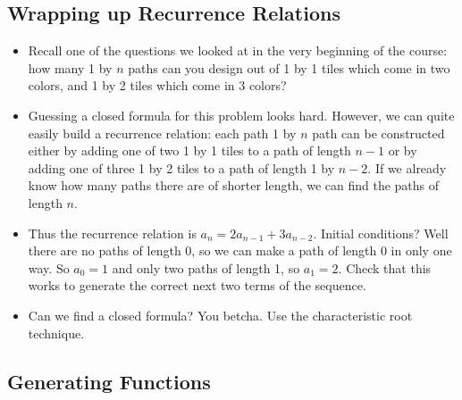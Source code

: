 \subsection*{Wrapping up Recurrence Relations}
\begin{itemize}
 \item Recall one of the questions we looked at in the very beginning of the course: how many 1 by $n$ paths can you design out of 1 by 1 tiles which come in two colors, and 1 by 2 tiles which come in 3 colors?
 
 \item Guessing a closed formula for this problem looks hard.  However, we can quite easily build a recurrence relation: each path 1 by $n$ path can be constructed either by adding one of two 1 by 1 tiles to a path of length $n-1$ or by adding one of three 1 by 2 tiles to a path of length 1 by $n-2$.  If we already know how many paths there are of shorter length, we can find the paths of length $n$.
 
 \item Thus the recurrence relation is $a_n = 2a_{n-1} + 3a_{n-2}$.  Initial conditions?  Well there are no paths of length 0, so we can make a path of length 0 in only one way.  So $a_0 = 1$ and only two paths of length 1, so $a_1 = 2$.  Check that this works to generate the correct next two terms of the sequence.
 
 \item Can we find a closed formula?  You betcha.  Use the characteristic root technique.
\end{itemize}

\subsection*{Generating Functions}

